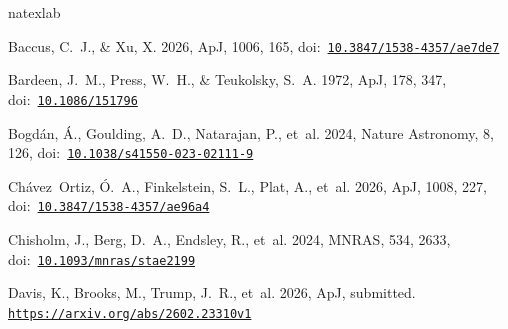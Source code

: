 \documentclass[pdflatex,sn-basic]{sn-jnl}
\providecommand{\bibinfo}[2]{}
\renewcommand{\bibinfo}[2]{}
\begin{document}
\clearpage

\begin{thebibliography}{}
\expandafter\ifx\csname natexlab\endcsname\relax\def\natexlab#1{#1}\fi
\providecommand{\url}[1]{\href{#1}{#1}}
\providecommand{\dodoi}[1]{doi:~\href{http://doi.org/#1}{\nolinkurl{#1}}}
\providecommand{\doeprint}[1]{\href{http://ascl.net/#1}{\nolinkurl{http://ascl.net/#1}}}
\providecommand{\doarXiv}[1]{\href{https://arxiv.org/abs/#1}{\nolinkurl{https://arxiv.org/abs/#1}}}

Baccus, C.~J., \& Xu, X. 2026, \bibinfo{title}{A Comprehensive JWST/NIRSpec
  Census of Broad-line Active Galactic Nuclei: Faint, Low-mass Accretors and a
  Population of Little Red Dots,} ApJ, 1006, 165,
  \dodoi{10.3847/1538-4357/ae7de7}

Bardeen, J.~M., Press, W.~H., \& Teukolsky, S.~A. 1972,
  \bibinfo{title}{Rotating Black Holes: Locally Nonrotating Frames, Energy
  Extraction, and Scalar Synchrotron Radiation,} ApJ, 178, 347,
  \dodoi{10.1086/151796}

Bogd{\'{a}}n, {\'{A}}., Goulding, A.~D., Natarajan, P., {et~al.} 2024,
  \bibinfo{title}{Evidence for heavy-seed origin of early supermassive black
  holes from a z \ensuremath{\approx} 10 X-ray quasar,} Nature Astronomy, 8, 126,
  \dodoi{10.1038/s41550-023-02111-9}

Ch{\'{a}}vez~Ortiz, {\'{O}}.~A., Finkelstein, S.~L., Plat, A., {et~al.} 2026,
  \bibinfo{title}{Significant Evidence of an Active Galactic Nucleus
  Contribution in GHZ2 at z = 12.34,} ApJ, 1008, 227,
  \dodoi{10.3847/1538-4357/ae96a4}

Chisholm, J., Berg, D.~A., Endsley, R., {et~al.} 2024, \bibinfo{title}{[Ne v]
  emission from a faint epoch of reionization-era galaxy: evidence for a
  narrow-line intermediate-mass black hole,} MNRAS, 534, 2633,
  \dodoi{10.1093/mnras/stae2199}

Davis, K., Brooks, M., Trump, J.~R., {et~al.} 2026, \bibinfo{title}{Extreme
  Emission Line Galaxies in CEERS Are Powered by Star Formation, not AGN,} ApJ,
  submitted.
\newblock \doarXiv{2602.23310v1}


\end{thebibliography}
\end{document}
